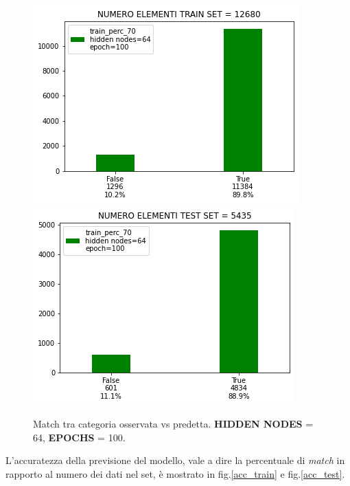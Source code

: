 \documentclass[10pt,a4paper]{report}
\begin{document}
\begin{figure}[htpb]
\centering
\includegraphics[scale=.6]{Plot/equality_train_perc_70_64_hidden_nodes_epoch_100.png}\\
\includegraphics[scale=.6]{Plot/equality_test_perc_70_64_hidden_nodes_epoch_100.png}
\caption{Match tra categoria osservata vs predetta. \textbf{HIDDEN NODES} = 64, \textbf{EPOCHS} = 100.}
\label{h_64_100}
\end{figure}

%
\newpage

L'accuratezza della previsione del modello, vale a dire la percentuale di \textit{match} in rapporto al numero dei dati nel set, è mostrato in fig.\ref{acc_train} e fig.\ref{acc_test}.
\end{document}
